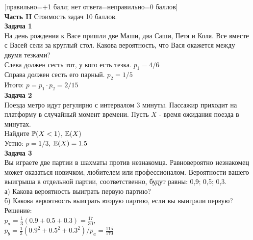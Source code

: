 \documentclass[12pt, a4paper]{article}\usepackage[]{graphicx}\usepackage[]{color}
\begin{document}
	$[$правильно=+1 балл; нет ответа=неправильно=0 баллов$]$ \\



	\textbf{Часть II} Стоимость задач 10 баллов. \\


	\textbf{Задача 1} \\ %
	На день рождения к Васе пришли две Маши, два Саши, Петя и Коля. Все вместе с Васей сели за круглый стол. Какова вероятность, что Вася окажется между двумя тезками? \\
	Слева должен сесть тот, у кого есть тезка. $p_{1}=4/6$\\
	Справа должен сесть его парный. $p_{2}=1/5$ \\
	Итого: $p=p_{1}\cdot p_{2}=2/15$ \\

	\textbf{Задача 2} \\ %
	Поезда метро идут регулярно с интервалом 3 минуты. Пассажир
	приходит на платформу в случайный момент времени. Пусть $X$ -
	время ожидания поезда в минутах. \\
	Найдите $\P(X<1)$, $\E(X)$ \\
	Устно: $p=1/3$, $\E(X)=1.5$ \\


	\textbf{Задача 3} \\ %
	Вы играете две партии в шахматы против незнакомца. Равновероятно
	незнакомец может оказаться новичком, любителем или профессионалом.
	Вероятности вашего выигрыша в отдельной партии, соответственно,
	будут равны: 0,9; 0,5; 0,3. \\
	а) Какова вероятность выиграть первую партию? \\
	б) Какова вероятность выиграть вторую партию, если вы выиграли
	первую? \\
	Решение: \\
	$p_{a}=\frac{1}{3}(0.9+0.5+0.3)=\frac{17}{30}$, \\
	$p_{b}=\frac{1}{3}(0.9^{2}+0.5^{2}+0.3^{2})/p_{a}=\frac{115}{170}$ \\
\end{document}
